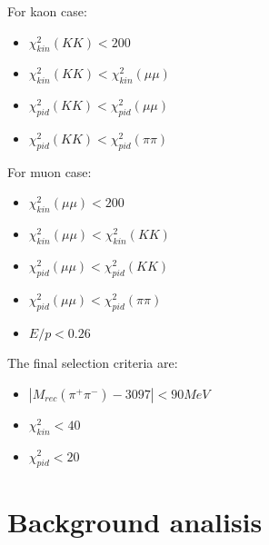 \documentclass[a4paper,12pt]{article}
\newcommand{\pipi}{\pi^{+}\pi^{-}}
\begin{document}
\begin{minipage}{0.49\textwidth}
For kaon case:
\begin{itemize}
  \item $\chi^2_{kin}(KK) <200$
	\item $\chi^2_{kin}(KK) < \chi^2_{kin}(\mu\mu)$
	\item $\chi^2_{pid}(KK) < \chi^2_{pid}(\mu\mu)$
	\item $\chi^2_{pid}(KK) < \chi^2_{pid}(\pi\pi)$
\end{itemize}
\end{minipage}
\hfill
\begin{minipage}{0.49\textwidth}
For muon case:
\begin{itemize}
  \item $\chi^2_{kin}(\mu\mu) < 200$
	\item $\chi^2_{kin}(\mu\mu) < \chi^2_{kin}(KK)$
	\item $\chi^2_{pid}(\mu\mu) < \chi^2_{pid}(KK)$
	\item $\chi^2_{pid}(\mu\mu) < \chi^2_{pid}(\pi\pi)$
  \item $E/p<0.26$     
\end{itemize}
\end{minipage}

The final selection criteria are:
\begin{itemize}
\item $|M_{rec}(\pipi)-3097| < 90 MeV$
\item $\chi^2_{kin} < 40$
\item $\chi^2_{pid} < 20$
\end{itemize}

\section{Background analisis}
\end{document}
